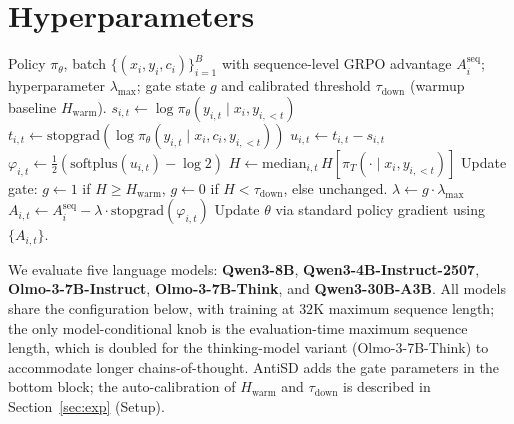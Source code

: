 \documentclass{llmxive}
\begin{document}
\section{Hyperparameters}
\label{app:hparams}

\begin{algorithm}[h]
  \caption{Anti-Self-Distillation (AntiSD) -- one training step.}
  \label{alg:antisd}
  \begin{algorithmic}[1]
    \Require Policy $\pi_\theta$, batch $\{(x_i, y_i, c_i)\}_{i=1}^B$ with sequence-level GRPO advantage $A_i^{\mathrm{seq}}$; hyperparameter $\lambda_{\max}$; gate state $g$ and calibrated threshold $\tau_{\mathrm{down}}$ (warmup baseline $H_{\mathrm{warm}}$).
    \State $s_{i,t} \gets \log \pi_\theta(y_{i,t} \mid x_i, y_{i,<t})$ 
    \State $t_{i,t} \gets \mathrm{stopgrad}\!\left(\log \pi_\theta(y_{i,t} \mid x_i, c_i, y_{i,<t})\right)$ 
    \State $u_{i,t} \gets t_{i,t} - s_{i,t}$ \label{algline:u} 
    \State $\varphi_{i,t} \gets \tfrac{1}{2}(\mathrm{softplus}(u_{i,t}) - \log 2)$ \label{algline:phi} 
    \EndFor
    \State $H \gets \mathrm{median}_{i,t}\, H[\pi_T(\cdot \mid x_i, y_{i,<t})]$ 
    \State Update gate: $g \gets 1$ if $H \ge H_{\mathrm{warm}}$, $g \gets 0$ if $H < \tau_{\mathrm{down}}$, else unchanged.
    \State $\lambda \gets g \cdot \lambda_{\max}$ \label{algline:lambda}
    \State $A_{i,t} \gets A_i^{\mathrm{seq}} - \lambda \cdot \mathrm{stopgrad}(\varphi_{i,t})$ \label{algline:advantage} 
    \State Update $\theta$ via standard policy gradient using $\{A_{i,t}\}$.
  \end{algorithmic}
\end{algorithm}

We evaluate five language models: \textbf{Qwen3-8B}, \textbf{Qwen3-4B-Instruct-2507}, \textbf{Olmo-3-7B-Instruct}, \textbf{Olmo-3-7B-Think}, and \textbf{Qwen3-30B-A3B}. All models share the configuration below, with training at $32$K maximum sequence length; the only model-conditional knob is the evaluation-time maximum sequence length, which is doubled for the thinking-model variant (Olmo-3-7B-Think) to accommodate longer chains-of-thought. AntiSD adds the gate parameters in the bottom block; the auto-calibration of $H_{\mathrm{warm}}$ and $\tau_{\mathrm{down}}$ is described in Section~\ref{sec:exp} (Setup).
\end{document}
